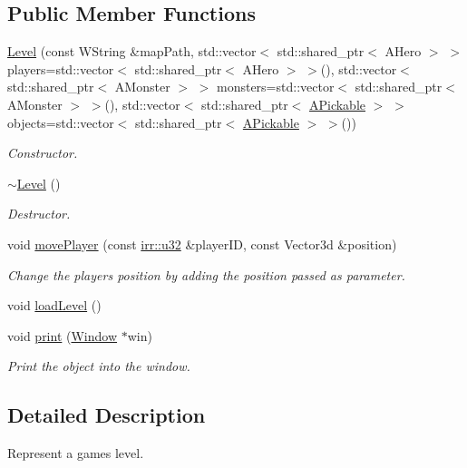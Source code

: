 \subsection*{Public Member Functions}
\begin{DoxyCompactItemize}
\item 
\hyperlink{classLevel_a1cddef79da66a80002686199a847543f}{Level} (const W\+String \&map\+Path, std\+::vector$<$ std\+::shared\+\_\+ptr$<$ A\+Hero $>$ $>$ players=std\+::vector$<$ std\+::shared\+\_\+ptr$<$ A\+Hero $>$ $>$(), std\+::vector$<$ std\+::shared\+\_\+ptr$<$ A\+Monster $>$ $>$ monsters=std\+::vector$<$ std\+::shared\+\_\+ptr$<$ A\+Monster $>$ $>$(), std\+::vector$<$ std\+::shared\+\_\+ptr$<$ \hyperlink{classAPickable}{A\+Pickable} $>$ $>$ objects=std\+::vector$<$ std\+::shared\+\_\+ptr$<$ \hyperlink{classAPickable}{A\+Pickable} $>$ $>$())
\begin{DoxyCompactList}\small\item\em Constructor. \end{DoxyCompactList}\item 
\hyperlink{classLevel_a249eac1e8f19ff44134efa5e986feaca}{$\sim$\+Level} ()
\begin{DoxyCompactList}\small\item\em Destructor. \end{DoxyCompactList}\item 
void \hyperlink{classLevel_ac679a141274c19107c288fe40b967e95}{move\+Player} (const \hyperlink{namespaceirr_a0416a53257075833e7002efd0a18e804}{irr\+::u32} \&player\+ID, const Vector3d \&position)
\begin{DoxyCompactList}\small\item\em Change the player\textquotesingle{}s position by adding the position passed as parameter. \end{DoxyCompactList}\item 
void \hyperlink{classLevel_aa88db36cd824320cb599d913603dc2a3}{load\+Level} ()
\item 
void \hyperlink{classLevel_ab8311fe64b7957d627053359331b0b6b}{print} (\hyperlink{classWindow}{Window} $\ast$win)
\begin{DoxyCompactList}\small\item\em Print the object into the window. \end{DoxyCompactList}\end{DoxyCompactItemize}


\subsection{Detailed Description}
Represent a game\textquotesingle{}s level. 

